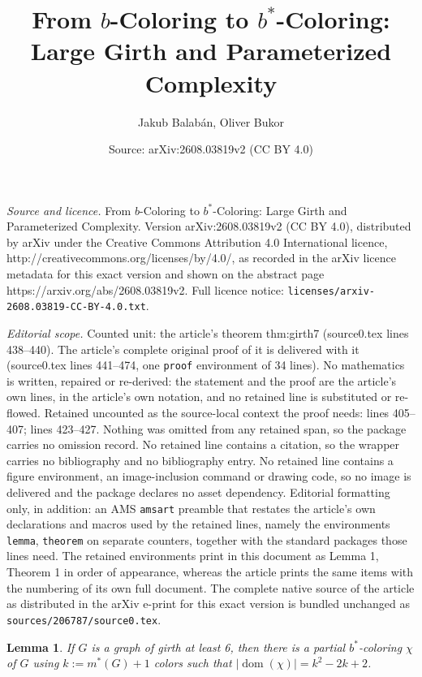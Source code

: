 \documentclass[10pt,a4paper]{amsart}
\title{From $b$-Coloring to $b^*$-Coloring: Large Girth and Parameterized Complexity}
\author{Jakub Balab\'an, Oliver Bukor}
\date{Source: arXiv:2608.03819v2 (CC BY 4.0)}
\newtheorem{lemma}{Lemma}
\DeclareMathOperator{\dom}{dom}
\begin{document}
\maketitle

\noindent\emph{Source and licence.} From $b$-Coloring to $b^*$-Coloring: Large Girth and Parameterized Complexity. Version arXiv:2608.03819v2 (CC BY 4.0), distributed by arXiv under the Creative Commons Attribution 4.0 International licence, http://creativecommons.org/licenses/by/4.0/, as recorded in the arXiv licence metadata for this exact version and shown on the abstract page https://arxiv.org/abs/2608.03819v2. Full licence notice: \texttt{licenses/arxiv-2608.03819-CC-BY-4.0.txt}.\par\smallskip

\noindent\textit{Editorial scope.} Counted unit: the article's theorem thm:girth7 (source0.tex lines 438--440). The article's complete original proof of it is delivered with it (source0.tex lines 441--474, one \texttt{proof} environment of 34 lines). No mathematics is written, repaired or re-derived: the statement and the proof are the article's own lines, in the article's own notation, and no retained line is substituted or re-flowed.  Retained uncounted as the source-local context the proof needs: lines 405--407; lines 423--427.  Nothing was omitted from any retained span, so the package carries no omission record.  No retained line contains a citation, so the wrapper carries no bibliography and no bibliography entry.  No retained line contains a figure environment, an image-inclusion command or drawing code, so no image is delivered and the package declares no asset dependency.  Editorial formatting only, in addition: an AMS \texttt{amsart} preamble that restates the article's own declarations and macros used by the retained lines, namely the environments \texttt{lemma}, \texttt{theorem} on separate counters, together with the standard packages those lines need.  The retained environments print in this document as Lemma 1, Theorem 1 in order of appearance, whereas the article prints the same items with the numbering of its own full document.  The complete native source of the article as distributed in the arXiv e-print for this exact version is bundled unchanged as \texttt{sources/206787/source0.tex}.
\begin{lemma}\label{lem:g6-init}
If $G$ is a graph of girth at least 6, then there is a partial $b^*$-coloring $\chi$ of $G$ using $k := m^*(G)+1$ colors such that $|\dom(\chi)| = k^2 -2k + 2$.
\end{lemma}
\end{document}
